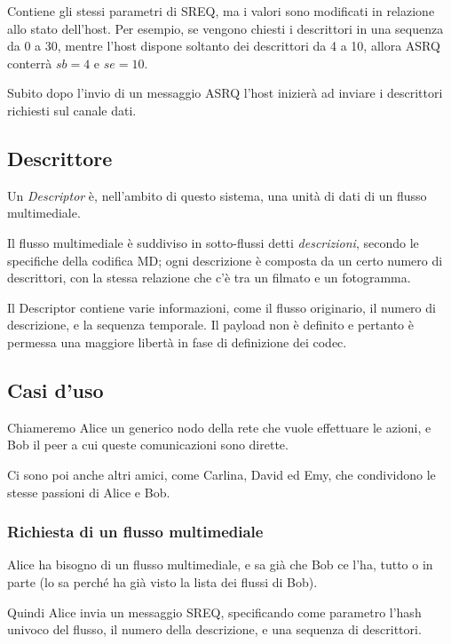 Contiene gli stessi parametri di SREQ, ma i valori sono
modificati in relazione allo stato dell'host. Per esempio, se vengono chiesti i
descrittori in una sequenza da 0 a 30, mentre l'host dispone soltanto dei
descrittori da 4 a 10, allora ASRQ conterrà $sb=4$ e $se=10$.

Subito dopo l'invio di un messaggio ASRQ l'host inizierà ad inviare i
descrittori richiesti sul canale dati.



\subsection{Descrittore}


Un \emph{Descriptor} è, nell'ambito di questo sistema, una unità di dati di un
flusso multimediale.

Il flusso multimediale è suddiviso in sotto-flussi detti \emph{descrizioni},
secondo le specifiche della codifica MD; ogni descrizione è composta da un certo numero
di descrittori, con la stessa relazione che c'è tra un filmato e un fotogramma.

Il Descriptor contiene varie informazioni, come il flusso originario, il numero
di descrizione, e la sequenza temporale. Il payload non è definito e pertanto è
permessa una maggiore libertà in fase di definizione dei codec.

\subsection{Casi d'uso}

Chiameremo Alice un generico nodo della rete che vuole effettuare le azioni, e
Bob il peer a cui queste comunicazioni sono dirette.

Ci sono poi anche altri amici, come Carlina, David ed Emy, che condividono le
stesse passioni di Alice e Bob.


\subsubsection{Richiesta di un flusso multimediale}
%

Alice ha bisogno di un flusso multimediale, e sa già che Bob ce l'ha, tutto o in
parte (lo sa perché ha già visto la lista dei flussi di Bob).

Quindi Alice invia un messaggio SREQ, specificando come parametro l'hash univoco
del flusso, il numero della descrizione, e una sequenza di descrittori.

